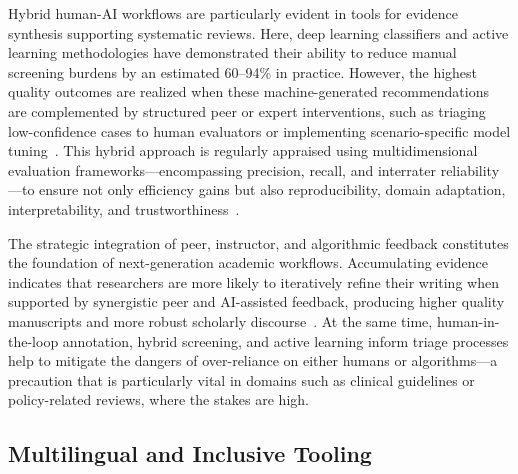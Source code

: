 Hybrid human-AI workflows are particularly evident in tools for evidence synthesis supporting systematic reviews. Here, deep learning classifiers and active learning methodologies have demonstrated their ability to reduce manual screening burdens by an estimated 60--94\% in practice. However, the highest quality outcomes are realized when these machine-generated recommendations are complemented by structured peer or expert interventions, such as triaging low-confidence cases to human evaluators or implementing scenario-specific model tuning~\cite{ref28,ref29,ref30,ref37,ref39,ref49,ref80,ref86,ref88,ref89,ref91,ref92,ref94,ref96,ref98,ref107,ref108}. This hybrid approach is regularly appraised using multidimensional evaluation frameworks—encompassing precision, recall, and interrater reliability—to ensure not only efficiency gains but also reproducibility, domain adaptation, interpretability, and trustworthiness~\cite{ref28,ref29,ref31,ref38,ref39,ref49,ref62,ref76,ref80,ref88,ref89,ref90,ref91,ref94,ref96,ref97,ref98,ref108}.

The strategic integration of peer, instructor, and algorithmic feedback constitutes the foundation of next-generation academic workflows. Accumulating evidence indicates that researchers are more likely to iteratively refine their writing when supported by synergistic peer and AI-assisted feedback, producing higher quality manuscripts and more robust scholarly discourse~\cite{ref88,ref89,ref91,ref92,ref96,ref98,ref107,ref108}. At the same time, human-in-the-loop annotation, hybrid screening, and active learning inform triage processes help to mitigate the dangers of over-reliance on either humans or algorithms—a precaution that is particularly vital in domains such as clinical guidelines or policy-related reviews, where the stakes are high.

\subsection{Multilingual and Inclusive Tooling}


